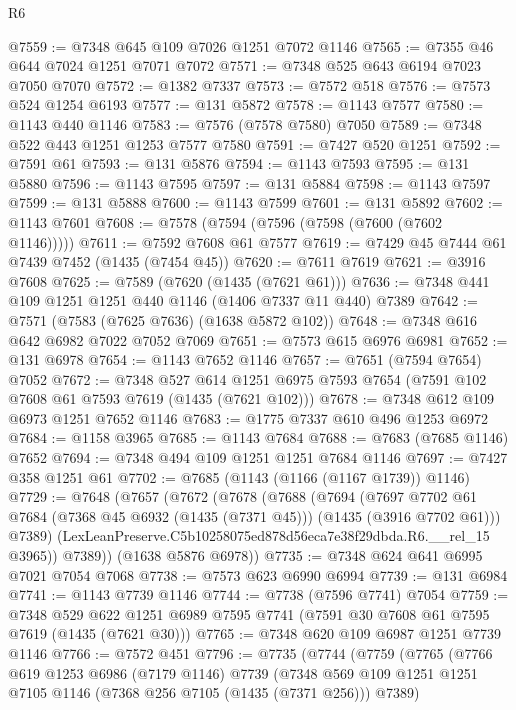 \begin{lexlean}{R6}
\begin{coremodule}
@7559 := @7348 @645 @109 @7026 @1251 @7072 @1146
@7565 := @7355 @46 @644 @7024 @1251 @7071 @7072
@7571 := @7348 @525 @643 @6194 @7023 @7050 @7070
@7572 := @1382 @7337
@7573 := @7572 @518
@7576 := @7573 @524 @1254 @6193
@7577 := @131 @5872
@7578 := @1143 @7577
@7580 := @1143 @440 @1146
@7583 := @7576 (@7578 @7580) @7050
@7589 := @7348 @522 @443 @1251 @1253 @7577 @7580
@7591 := @7427 @520 @1251
@7592 := @7591 @61
@7593 := @131 @5876
@7594 := @1143 @7593
@7595 := @131 @5880
@7596 := @1143 @7595
@7597 := @131 @5884
@7598 := @1143 @7597
@7599 := @131 @5888
@7600 := @1143 @7599
@7601 := @131 @5892
@7602 := @1143 @7601
@7608 := @7578 (@7594 (@7596 (@7598 (@7600 (@7602 @1146)))))
@7611 := @7592 @7608 @61 @7577
@7619 := @7429 @45 @7444 @61 @7439 @7452 (@1435 (@7454 @45))
@7620 := @7611 @7619
@7621 := @3916 @7608
@7625 := @7589 (@7620 (@1435 (@7621 @61)))
@7636 := @7348 @441 @109 @1251 @1251 @440 @1146 (@1406 @7337 @11 @440) @7389
@7642 := @7571 (@7583 (@7625 @7636) (@1638 @5872 @102))
@7648 := @7348 @616 @642 @6982 @7022 @7052 @7069
@7651 := @7573 @615 @6976 @6981
@7652 := @131 @6978
@7654 := @1143 @7652 @1146
@7657 := @7651 (@7594 @7654) @7052
@7672 := @7348
    @527
    @614
    @1251
    @6975
    @7593
    @7654
    (@7591 @102 @7608 @61 @7593 @7619 (@1435 (@7621 @102)))
@7678 := @7348 @612 @109 @6973 @1251 @7652 @1146
@7683 := @1775 @7337 @610 @496 @1253 @6972
@7684 := @1158 @3965
@7685 := @1143 @7684
@7688 := @7683 (@7685 @1146) @7652
@7694 := @7348 @494 @109 @1251 @1251 @7684 @1146
@7697 := @7427 @358 @1251 @61
@7702 := @7685 (@1143 (@1166 (@1167 @1739)) @1146)
@7729 := @7648
    (@7657
      (@7672
        (@7678
          (@7688
            (@7694
              (@7697
                @7702
                @61
                @7684
                (@7368 @45 @6932 (@1435 (@7371 @45)))
                (@1435 (@3916 @7702 @61)))
              @7389)
            (LexLeanPreserve.C5b10258075ed878d56eca7e38f29dbda.R6.__rel_15 @3965))
          @7389))
      (@1638 @5876 @6978))
@7735 := @7348 @624 @641 @6995 @7021 @7054 @7068
@7738 := @7573 @623 @6990 @6994
@7739 := @131 @6984
@7741 := @1143 @7739 @1146
@7744 := @7738 (@7596 @7741) @7054
@7759 := @7348
    @529
    @622
    @1251
    @6989
    @7595
    @7741
    (@7591 @30 @7608 @61 @7595 @7619 (@1435 (@7621 @30)))
@7765 := @7348 @620 @109 @6987 @1251 @7739 @1146
@7766 := @7572 @451
@7796 := @7735
    (@7744
      (@7759
        (@7765
          (@7766
            @619
            @1253
            @6986
            (@7179 @1146)
            @7739
            (@7348 @569 @109 @1251 @1251 @7105 @1146 (@7368 @256 @7105 (@1435 (@7371 @256))) @7389)

\end{coremodule}
\end{lexlean}
